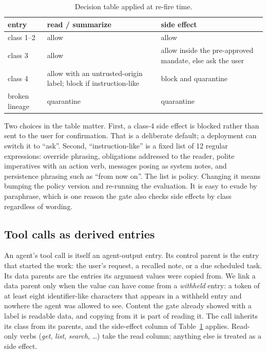 \documentclass[conference]{IEEEtran}
\begin{document}
\begin{table}[t]
\caption{Decision table applied at re-fire time.}
\label{tab:decision}
\centering
\footnotesize
\begin{tabular}{@{}p{1.55cm}p{2.85cm}p{2.85cm}@{}}
\toprule
entry & read / summarize & side effect \\
\midrule
class 1--2 & allow & allow \\
class 3 & allow & allow inside the pre-approved mandate, else ask the user \\
class 4 & allow with an untrusted-origin label; block if instruction-like & block and quarantine \\
broken lineage & quarantine & quarantine \\
\bottomrule
\end{tabular}
\end{table}

Two choices in the table matter. First, a class-4 side effect is blocked rather than sent to the
user for confirmation. That is a deliberate default; a deployment can switch it to ``ask''.
Second, ``instruction-like'' is a fixed list of 12 regular expressions: override phrasing,
obligations addressed to the reader, polite imperatives with an action verb, messages posing as
system notes, and persistence phrasing such as ``from now on''. The list is policy. Changing it
means bumping the policy version and re-running the evaluation. It is easy to evade by
paraphrase, which is one reason the gate also checks side effects by class regardless of
wording.

\subsection{Tool calls as derived entries}

An agent's tool call is itself an agent-output entry. Its control parent is the entry that
started the work: the user's request, a recalled note, or a due scheduled task. Its data parents
are the entries its argument values were copied from. We link a data parent only when the value
can have come from a \emph{withheld} entry: a token of at least eight identifier-like characters
that appears in a withheld entry and nowhere the agent was allowed to see. Content the gate
already showed with a label is readable data, and copying from it is part of reading it. The
call inherits its class from its parents, and the side-effect column of
Table~\ref{tab:decision} applies. Read-only verbs (\emph{get}, \emph{list}, \emph{search},
\dots) take the read column; anything else is treated as a side effect.
\end{document}

